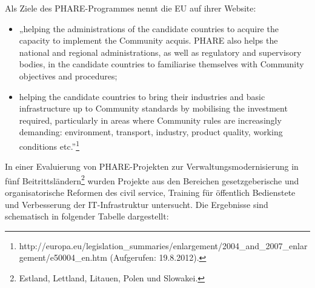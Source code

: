 Als Ziele des PHARE-Programmes nennt die EU auf ihrer Website:
\begin{itemize}
\item „helping the administrations of the candidate countries to acquire the capacity to implement the Community acquis. PHARE also helps the national and regional administrations, as well as regulatory and supervisory bodies, in the candidate countries to familiarise themselves with Community objectives and procedures;
\item helping the candidate countries to bring their industries and basic infrastructure up to Community standards by mobilising the investment required, particularly in areas where Community rules are increasingly demanding: environment, transport, industry, product quality, working conditions etc.”\footnote{http://europa.eu/legislation\_summaries/enlargement/2004\_and\_2007\_enlargement/e50004\_en.htm (Aufgerufen: 19.8.2012).}
\end{itemize}
In einer Evaluierung von PHARE-Projekten zur Verwaltungsmodernisierung in fünf Beitrittsländern\footnote{Estland, Lettland, Litauen, Polen und Slowakei.} wurden Projekte aus den Bereichen gesetzgeberische und organisatorische Reformen des civil service, Training für öffentlich Bedienstete und Verbesserung der IT-Infrastruktur untersucht. Die Ergebnisse sind schematisch in folgender Tabelle dargestellt:
